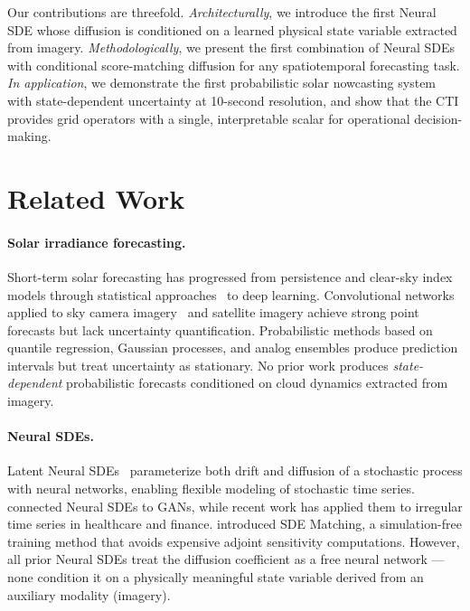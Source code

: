 \documentclass{article}
\begin{document}
Our contributions are threefold. \emph{Architecturally}, we introduce the first Neural SDE whose diffusion is conditioned on a learned physical state variable extracted from imagery. \emph{Methodologically}, we present the first combination of Neural SDEs with conditional score-matching diffusion for any spatiotemporal forecasting task. \emph{In application}, we demonstrate the first probabilistic solar nowcasting system with state-dependent uncertainty at 10-second resolution, and show that the CTI provides grid operators with a single, interpretable scalar for operational decision-making.

\section{Related Work}
\label{sec:related}

\paragraph{Solar irradiance forecasting.}
Short-term solar forecasting has progressed from persistence and clear-sky index models through statistical approaches~\citep{yang2021benchmarking} to deep learning. Convolutional networks applied to sky camera imagery~\citep{sun2019solar} and satellite imagery achieve strong point forecasts but lack uncertainty quantification. Probabilistic methods based on quantile regression, Gaussian processes, and analog ensembles produce prediction intervals but treat uncertainty as stationary. No prior work produces \emph{state-dependent} probabilistic forecasts conditioned on cloud dynamics extracted from imagery.

\paragraph{Neural SDEs.}
Latent Neural SDEs~\citep{li2020scalable} parameterize both drift and diffusion of a stochastic process with neural networks, enabling flexible modeling of stochastic time series. \citet{kidger2021neural} connected Neural SDEs to GANs, while recent work has applied them to irregular time series in healthcare and finance. \citet{bartosh2025sde} introduced SDE Matching, a simulation-free training method that avoids expensive adjoint sensitivity computations. However, all prior Neural SDEs treat the diffusion coefficient as a free neural network --- none condition it on a physically meaningful state variable derived from an auxiliary modality (imagery).
\end{document}

